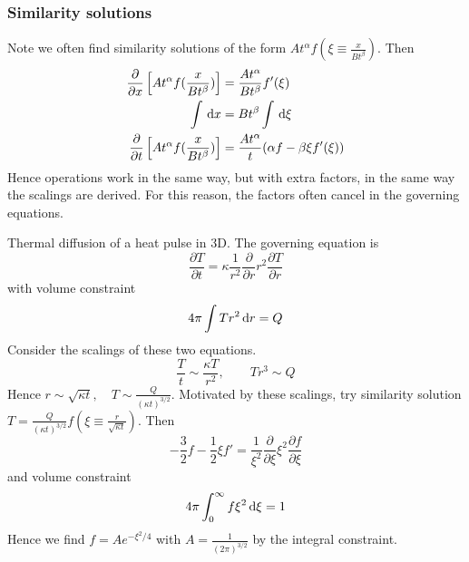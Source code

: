 \documentclass{jknotes}
\begin{document}
\subsubsection{Similarity solutions}
Note we often find similarity solutions of the form $At^\alpha f(\xi \equiv
\frac{x}{Bt^\beta})$. Then
\begin{align}
	\frac{\partial}{\partial x} \left[ At^\alpha f(\frac{x}{Bt^\beta})\right]
	&= \frac{At^\alpha}{Bt^\beta} f'(\xi) \\
	\int \, \diffd x &= Bt^\beta \int \, \diffd \xi \\
	\frac{\partial}{\partial t}\left[ At^\alpha f(\frac{x}{Bt^\beta})\right]
	&= \frac{A t^\alpha}{t} (\alpha f - \beta \xi f'(\xi))
\end{align}
Hence operations work in the same way, but with extra factors, in the same way
the scalings are derived. For this reason, the factors often cancel in the
governing equations.

\begin{eg}
	Thermal diffusion of a heat pulse in 3D.  The  governing equation is
	\begin{equation}
		\frac{\partial T}{\partial t} = \kappa \frac{1}{r^2}
		\frac{\partial}{\partial r} r^2 \frac{\partial T}{\partial r}
	\end{equation}
	with volume constraint
	\begin{equation}
		4\pi \int Tr^2 \, \diffd r = Q
	\end{equation}
	Consider the scalings of these two equations.
	\begin{equation}
		\frac{T}{t} \sim \frac{\kappa T}{r^2}, \hspace{2em} Tr^3 \sim Q
	\end{equation}
	Hence $r \sim \sqrt{\kappa t}, \hspace{1em} T \sim \frac{Q}{(\kappa
	t)^{3/2}}$. Motivated by these scalings, try similarity solution $T =
	\frac{Q}{(\kappa t)^{3/2}} f(\xi \equiv \frac{r}{\sqrt{\kappa t}})$. Then
	\begin{equation}
		-\frac{3}{2}f -\frac{1}{2}\xi f' = \frac{1}{\xi^2}
		\frac{\partial}{\partial \xi} \xi^2 \frac{\partial f}{\partial \xi}
	\end{equation}
	and volume constraint
	\begin{equation}
		4\pi \int_0^\infty f\xi^2 \, \diffd \xi = 1
	\end{equation}
	Hence we find $f = A e^{-\xi^2/4}$ with $A = \frac{1}{(2\pi)^{3/2}}$ by
	the integral constraint.
\end{eg}
\end{document}
